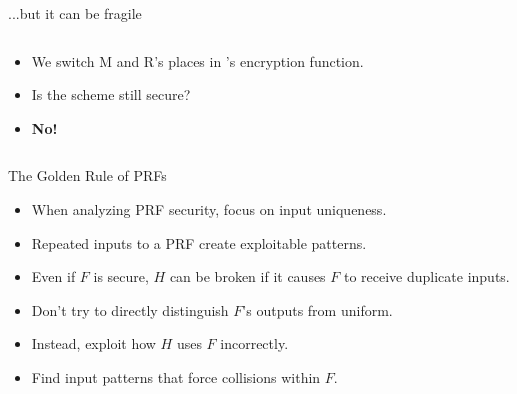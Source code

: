 \documentclass[aspectratio=169, lualatex, handout]{beamer}
\begin{document}
\begin{frame}{...but it can be fragile}
	\begin{columns}[c]
		\begin{column}{0.5\textwidth}
			\begin{itemize}[<+->]
				\item We switch M and R's places in 's encryption function.
				\item Is the scheme still secure?
				\item \textbf{No!}
			\end{itemize}
		\end{column}
		\begin{column}{0.5\textwidth}
		\end{column}
	\end{columns}
\end{frame}

\begin{frame}{The Golden Rule of PRFs}
	\begin{itemize}[<+->]
		\item When analyzing PRF security, focus on input uniqueness.
		\item Repeated inputs to a PRF create exploitable patterns.
		\item Even if $F$ is secure, $H$ can be broken if it causes $F$ to receive duplicate inputs.
		\item Don't try to directly distinguish $F$'s outputs from uniform.
		\item Instead, exploit how $H$ uses $F$ incorrectly.
		\item Find input patterns that force collisions within $F$.
	\end{itemize}
\end{frame}
\end{document}
